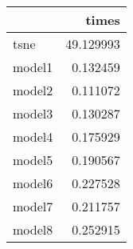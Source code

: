 \begin{tabular}{lr}
\toprule
{} &      times \\
\midrule
tsne   &  49.129993 \\
model1 &   0.132459 \\
model2 &   0.111072 \\
model3 &   0.130287 \\
model4 &   0.175929 \\
model5 &   0.190567 \\
model6 &   0.227528 \\
model7 &   0.211757 \\
model8 &   0.252915 \\
\bottomrule
\end{tabular}
